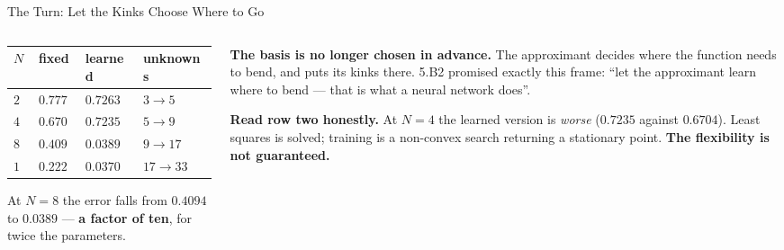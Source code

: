 \begin{frame}{The Turn: Let the Kinks Choose Where to Go}
\begin{columns}[T]
\begin{column}{0.52\textwidth}
\begin{center}\footnotesize
\begin{tabularx}{\linewidth}{@{}>{\raggedleft\arraybackslash}p{0.8cm} >{\raggedleft\arraybackslash}X >{\raggedleft\arraybackslash}X >{\raggedleft\arraybackslash}X@{}}
\toprule
$N$ & \textbf{fixed} & \textbf{learned} & \textbf{unknowns} \\
\midrule
$2$ & $0.7779$ & $0.7263$ & $3\to5$ \\
$4$ & $0.6704$ & $0.7235$ & $5\to9$ \\
$8$ & $0.4094$ & $0.0389$ & $9\to17$ \\
$16$ & $0.2220$ & $0.0370$ & $17\to33$ \\
\bottomrule
\end{tabularx}
\end{center}
\medskip
At $N=8$ the error falls from $0.4094$ to $0.0389$ --- \textbf{a factor of ten}, for twice the parameters.
\end{column}
\begin{column}{0.45\textwidth}
\begin{takeawaybox}[title=\textbf{This is the whole session}]\small
\textbf{The basis is no longer chosen in advance.} The approximant decides where the function needs to bend, and puts its kinks there.
\medskip
5.B2 promised exactly this frame: ``let the approximant learn where to bend --- that is what a neural network does''.
\end{takeawaybox}
\medskip
\begin{cautionbox}\footnotesize
\textbf{Read row two honestly.} At $N=4$ the learned version is \emph{worse} ($0.7235$ against $0.6704$). Least squares is solved; training is a non-convex search returning a stationary point. \textbf{The flexibility is not guaranteed.}
\end{cautionbox}
\end{column}
\end{columns}
\vspace{1mm}
\end{frame}

